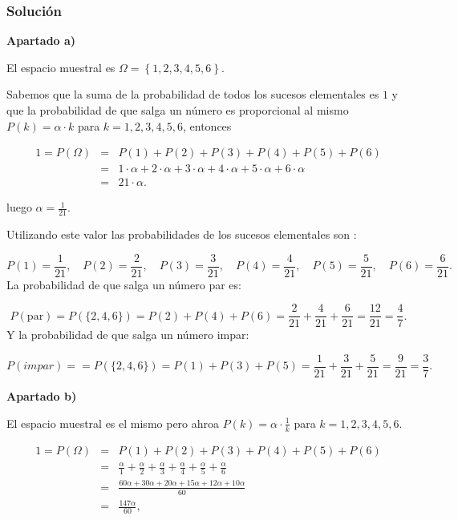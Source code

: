 \documentclass[
]{article}
\begin{document}
\hypertarget{soluciuxf3n-1}{%
\subsubsection{Solución}\label{soluciuxf3n-1}}

\textbf{Apartado a)}

El espacio muestral es \(\Omega= \left\{1, 2, 3, 4, 5, 6 \right\}\).

Sabemos que la suma de la probabilidad de todos los sucesos elementales
es \(1\) y que la probabilidad de que salga un número es proporcional al
mismo \(P(k)=\alpha\cdot k\) para \(k=1,2,3,4,5,6\), entonces

\begin{eqnarray*}
1=P(\Omega) & =& P(1) + P(2) + P(3) + P(4) + P(5) + P(6)\\ 
& = & 1\cdot \alpha + 2 \cdot \alpha + 3 \cdot \alpha + 4 \cdot \alpha + 5 \cdot \alpha + 6 \cdot \alpha \\
& =& 21 \cdot \alpha.
\end{eqnarray*}

luego \(\alpha= \frac1{21}.\)

Utilizando este valor las probabilidades de los sucesos elementales son
:

\[
P(1) = \frac{1}{21}, \quad P(2) = \frac{2}{21}, \quad 
P(3) = \frac{3}{21}, \quad 
P(4) = \frac{4}{21}, \quad 
P(5) = \frac{5}{21}, \quad 
P(6) = \frac{6}{21}.
\] La probabilidad de que salga un número par es:

\[
P(\mbox{par}) = P(\{2,4,6\})=P(2) + P(4) + P(6) = \frac{2}{21} + \frac{4}{21} + \frac{6}{21} = \frac{12}{21} = \frac{4}{7}.
\] Y la probabilidad de que salga un número impar:

\[
P(impar) = = P(\{2,4,6\})=P(1) + P(3) + P(5) = \frac{1}{21} + \frac{3}{21} + \frac{5}{21} = \frac{9}{21} = \frac{3}{7}.
\]

\textbf{Apartado b)}

El espacio muestral es el mismo pero ahroa
\(P(k)=\alpha\cdot \frac{1}{k}\) para \(k=1,2,3,4,5,6.\)

\begin{eqnarray*}
1=P(\Omega) &= & P(1) + P(2) + P(3) + P(4) + P(5) + P(6)\\
&=&  \frac{\alpha}{1} + \frac{\alpha}{2} + \frac{\alpha}{3} + \frac{\alpha}{4} + \frac{\alpha}{5} + \frac{\alpha}{6}\\
&=& \frac{60\alpha + 30\alpha + 20\alpha + 15\alpha + 12\alpha + 10\alpha}{60}  \\
&=&\frac{147\alpha}{60},
\end{eqnarray*}
\end{document}
